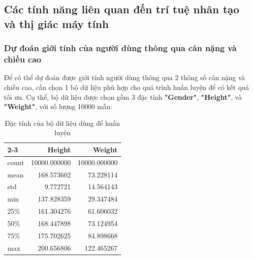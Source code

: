 \subsection{Các tính năng liên quan đến trí tuệ nhân tạo và thị giác máy tính}
\subsubsection{Dự đoán giới tính của người dùng thông qua cân nặng và chiều cao}
Để có thể dự đoán được giới tính người dùng thông qua 2 thông số cân nặng và chiều cao, cần chọn 1 bộ dữ liệu phù hợp cho quá trình huấn luyện để có kết quả tối ưu. Cụ thể, bộ dữ liệu được chọn  gồm 3 đặc tính \textbf{"Gender"}, \textbf{"Height"}, và \textbf{"Weight"}, với số lượng 10000 mẫu:

\begin{table}[!htp]
\centering
\begin{tabular}{l|r|r|}
\cline{2-3}
                            & \textbf{Height}       & \textbf{Weight}       \\ \hline
\multicolumn{1}{|l|}{count} & 10000.000000 & 10000.000000 \\ \hline
\multicolumn{1}{|l|}{mean}  & 168.573602   & 73.228114    \\ \hline
\multicolumn{1}{|l|}{std}   & 9.772721     & 14.564143    \\ \hline
\multicolumn{1}{|l|}{min}   & 137.828359   & 29.347484    \\ \hline
\multicolumn{1}{|l|}{25\%}  & 161.304276   & 61.606032    \\ \hline
\multicolumn{1}{|l|}{50\%}  & 168.447898   & 73.124954    \\ \hline
\multicolumn{1}{|l|}{75\%}  & 175.702625   & 84.898668    \\ \hline
\multicolumn{1}{|l|}{max}   & 200.656806   & 122.465267   \\ \hline
\end{tabular}
\caption{Đặc tính của bộ dữ liệu dùng để huấn luyện}
\end{table}

